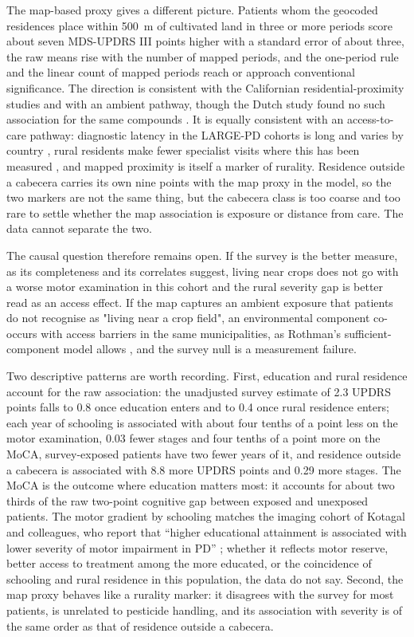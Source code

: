 \documentclass[11pt,a4paper]{article}
\begin{document}
The map-based proxy gives a different picture. Patients whom the geocoded residences place within 500~m of cultivated land in three or more periods score about seven MDS-UPDRS III points higher with a standard error of about three, the raw means rise with the number of mapped periods, and the one-period rule and the linear count of mapped periods reach or approach conventional significance. The direction is consistent with the Californian residential-proximity studies \citep{costello_parkinson_2009,li_proximity_2023} and with an ambient pathway, though the Dutch study found no such association for the same compounds \citep{brouwer_environmental_2017}. It is equally consistent with an access-to-care pathway: diagnostic latency in the LARGE-PD cohorts is long and varies by country \citep{ramchandra_sex_2025}, rural residents make fewer specialist visits where this has been measured \citep{crighton_patterns_2024}, and mapped proximity is itself a marker of rurality. Residence outside a cabecera carries its own nine points with the map proxy in the model, so the two markers are not the same thing, but the cabecera class is too coarse and too rare to settle whether the map association is exposure or distance from care. The data cannot separate the two.

The causal question therefore remains open. If the survey is the better measure, as its completeness and its correlates suggest, living near crops does not go with a worse motor examination in this cohort and the rural severity gap is better read as an access effect. If the map captures an ambient exposure that patients do not recognise as "living near a crop field", an environmental component co-occurs with access barriers in the same municipalities, as Rothman's sufficient-component model allows \citep{rothman_causes_1976,ritz_pesticides_2016}, and the survey null is a measurement failure.

Two descriptive patterns are worth recording. First, education and rural residence account for the raw association: the unadjusted survey estimate of 2.3 UPDRS points falls to 0.8 once education enters and to 0.4 once rural residence enters; each year of schooling is associated with about four tenths of a point less on the motor examination, 0.03 fewer stages and four tenths of a point more on the MoCA, survey-exposed patients have two fewer years of it, and residence outside a cabecera is associated with 8.8 more UPDRS points and 0.29 more stages. The MoCA is the outcome where education matters most: it accounts for about two thirds of the raw two-point cognitive gap between exposed and unexposed patients. The motor gradient by schooling matches the imaging cohort of Kotagal and colleagues, who report that ``higher educational attainment is associated with lower severity of motor impairment in PD'' \citep{kotagal_educational_2015}; whether it reflects motor reserve, better access to treatment among the more educated, or the coincidence of schooling and rural residence in this population, the data do not say. Second, the map proxy behaves like a rurality marker: it disagrees with the survey for most patients, is unrelated to pesticide handling, and its association with severity is of the same order as that of residence outside a cabecera.
\end{document}
